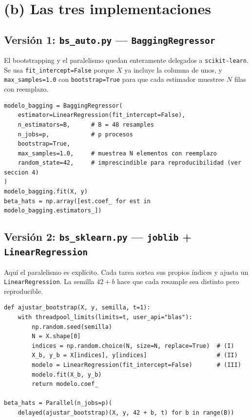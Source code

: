 \documentclass[11pt,letterpaper]{article}
\begin{document}
\section{(b) Las tres implementaciones}
\label{sec:b}

\subsection{Versión 1: \texttt{bs\_auto.py} --- \texttt{BaggingRegressor}}

El bootstrapping y el paralelismo quedan enteramente delegados a
\texttt{scikit-learn}. Se usa \texttt{fit\_intercept=False} porque $X$ ya incluye la
columna de unos, y \texttt{max\_samples=1.0} con \texttt{bootstrap=True} para que cada
estimador muestree $N$ filas con reemplazo.

\begin{lstlisting}[caption={Núcleo de \texttt{bs\_auto.py}.}]
modelo_bagging = BaggingRegressor(
    estimator=LinearRegression(fit_intercept=False),
    n_estimators=B,      # B = 48 resamples
    n_jobs=p,            # p procesos
    bootstrap=True,
    max_samples=1.0,     # muestrea N elementos con reemplazo
    random_state=42,     # imprescindible para reproducibilidad (ver seccion 4)
)
modelo_bagging.fit(X, y)
beta_hats = np.array([est.coef_ for est in modelo_bagging.estimators_])
\end{lstlisting}

\subsection{Versión 2: \texttt{bs\_sklearn.py} --- \texttt{joblib} + \texttt{LinearRegression}}

Aquí el paralelismo es explícito. Cada tarea sortea sus propios índices y ajusta un
\texttt{LinearRegression}. La semilla $42+b$ hace que cada resample sea distinto pero
reproducible.

\begin{lstlisting}[caption={Núcleo de \texttt{bs\_sklearn.py}.}]
def ajustar_bootstrap(X, y, semilla, t=1):
    with threadpool_limits(limits=t, user_api="blas"):
        np.random.seed(semilla)
        N = X.shape[0]
        indices = np.random.choice(N, size=N, replace=True)  # (I)
        X_b, y_b = X[indices], y[indices]                    # (II)
        modelo = LinearRegression(fit_intercept=False)       # (III)
        modelo.fit(X_b, y_b)
        return modelo.coef_

beta_hats = Parallel(n_jobs=p)(
    delayed(ajustar_bootstrap)(X, y, 42 + b, t) for b in range(B))
\end{lstlisting}
\end{document}
